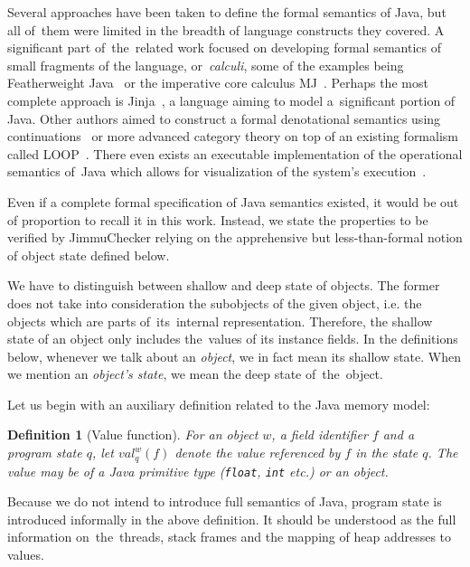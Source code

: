 \documentclass{pracamgr}
\theoremstyle{break}
\newtheorem{defi}{Definition}
\theoremstyle{break}
\theoremstyle{break}
\begin{document}
Several approaches have been taken to define the formal semantics of
Java, but all of~them were limited in the breadth of language
constructs they covered. A significant part of~the~related work
focused on developing formal semantics of small fragments of the
language, or~\emph{calculi}, some of the examples being Featherweight
Java~\cite{javasem:feather} or the imperative core calculus
MJ~\cite{javasem:mj}. Perhaps the most complete approach is
Jinja~\cite{javasem:jinja}, a language aiming to model a~significant
portion of Java. Other authors aimed to construct a formal
denotational semantics using continuations~\cite{sem:cont} or more
advanced category theory on top of an existing formalism called
LOOP~\cite{sem:cat}. There even exists an executable implementation of
the operational semantics of~Java which allows for visualization of
the system's execution~\cite{javasem:exec}.

Even if a complete formal specification of Java semantics existed, it
would be out of proportion to recall it in this work. Instead, we
state the properties to be verified by JimmuChecker relying on the
apprehensive but less-than-formal notion of object state defined below.

We have to distinguish between shallow and deep state of objects. The
former does not take into consideration the subobjects of the given
object, i.e. the objects which are parts of~its~internal
representation. Therefore, the shallow state of an object only
includes the~values of its instance fields. In the definitions below,
whenever we talk about an \emph{object}, we in fact mean its shallow
state. When we mention an \emph{object's state}, we mean the deep
state of~the~object.

Let us begin with an auxiliary definition related to the Java memory
model:
\begin{defi}[Value function]
  For an object $w$, a field identifier $f$ and a program state $q$,
  let $val_q^w(f)$ denote the value referenced by $f$ in the state
  $q$. The value may be of a Java primitive type (\texttt{float},
  \texttt{int} etc.) or an object.
\end{defi}
Because we do not intend to introduce full semantics of Java, program
state is introduced informally in the above definition. It should
be understood as the full information on~the~threads, stack frames and
the mapping of heap addresses to values. 
\end{document}
